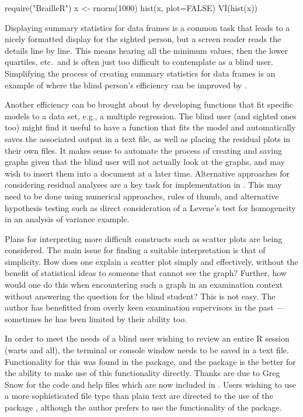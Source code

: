 \begin{example}
require("BrailleR")
x <- rnorm(1000)
hist(x, plot=FALSE)
VI(hist(x))
\end{example}


Displaying summary statistics for data frames is a common task that leads to a nicely formatted display for the sighted person, but a screen reader reads the details line by line. This means hearing all the minimum values, then the lower quartiles, etc.\ and is often just too difficult to contemplate as a blind user. Simplifying the process of creating summary statistics for data frames is an example of where the blind person's efficiency can be improved by .

Another efficiency can be brought about by developing functions that fit specific models to a data set, e.g., a multiple regression. The blind user (and sighted ones too) might find it useful to have a function that fits the model and automatically saves the associated output in a text file, as well as placing the residual plots in their own files. It makes sense to automate the process of creating and saving graphs given that the blind user will not actually look at the graphs, and may wish to insert them into a document at a later time. Alternative approaches for considering residual analyses are a key task for implementation in . This may need to be done using numerical approaches, rules of thumb, and alternative hypothesis testing such as direct consideration of a Levene's test for homogeneity in an analysis of variance example.

Plans for interpreting more difficult constructs such as scatter plots are being considered. The main issue for finding a suitable interpretation is that of simplicity. How does one explain a scatter plot simply and effectively, without the benefit of statistical ideas to someone that cannot see the graph? Further, how would one do this when encountering such a graph in an examination context without answering the question for the blind student? This is not easy. The author has benefitted from overly keen examination supervisors in the past --- sometimes he has been limited by their ability too.

In order to meet the needs of a blind user wishing to review an entire R session (warts and all), the terminal or console window needs to be saved in a text file. Functionality for this was found in the  package, and the  package is the better for the ability to make use of this functionality directly. Thanks are due to Greg Snow for the code and help files which are now included in . Users wishing to use a more sophisticated file type than plain text are directed to the use of the  package \citep{Lecoutre2003}, although the author prefers to use the  functionality of the  package.

